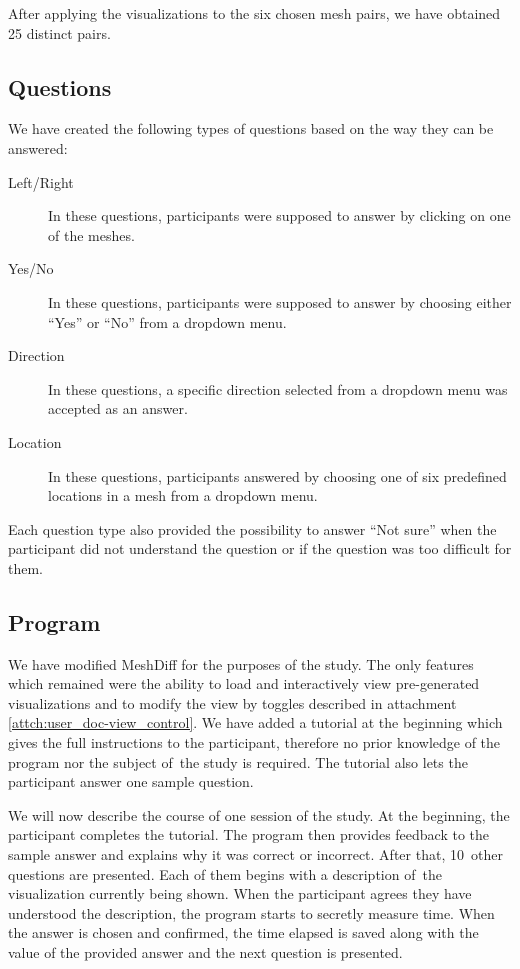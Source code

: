 After applying the visualizations to the six chosen mesh pairs, we have obtained 25 distinct pairs.

\subsection{Questions}
\label{subsec:user_study-setting-question}

We have created the following types of questions based on the way they can be answered:

\begin{description}
\item [Left/Right] In these questions, participants were supposed to answer by clicking on one of the meshes.
\item [Yes/No] In these questions, participants were supposed to answer by choosing either ``Yes'' or ``No'' from a dropdown menu.
\item [Direction] In these questions, a specific direction selected from a dropdown menu was accepted as an answer.
\item [Location] In these questions, participants answered by choosing one of six predefined locations in a mesh from a dropdown menu.
\end{description}

Each question type also provided the possibility to answer ``Not sure'' when the participant did not understand the question or if the question was too difficult for them.

\subsection{Program}
\label{subsec:user_study-setting-program}

We have modified MeshDiff for the purposes of the study. The only features which remained were the ability to load and interactively view pre-generated visualizations and to modify the view by toggles described in attachment \ref{attch:user_doc-view_control}. We have added a tutorial at the beginning which gives the full instructions to the participant, therefore no prior knowledge of the program nor the subject of~the study is required. The tutorial also lets the participant answer one sample question. 

We will now describe the course of one session of the study. At the beginning, the participant completes the tutorial. The program then provides feedback to the sample answer and explains why it was correct or incorrect. After that, 10~other questions are presented. Each of them begins with a description of~the visualization currently being shown. When the participant agrees they have understood the description, the program starts to secretly measure time. When the answer is chosen and confirmed, the time elapsed is saved along with the value of the provided answer and the next question is presented.

